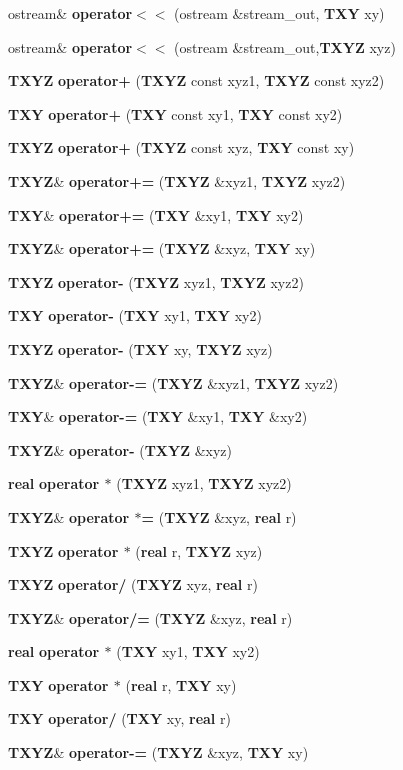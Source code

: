 \begin{CompactItemize}
\item 
ostream\& {\bf operator$<$$<$} (ostream \&stream\_\-out, {\bf TXY} xy)
\item 
ostream\& {\bf operator$<$$<$} (ostream \&stream\_\-out,{\bf TXYZ} xyz)
\item 
{\bf TXYZ} {\bf operator+} ({\bf TXYZ} const xyz1, {\bf TXYZ} const xyz2)
\item 
{\bf TXY} {\bf operator+} ({\bf TXY} const xy1, {\bf TXY} const xy2)
\item 
{\bf TXYZ} {\bf operator+} ({\bf TXYZ} const xyz, {\bf TXY} const xy)
\item 
{\bf TXYZ}\& {\bf operator+=} ({\bf TXYZ} \&xyz1, {\bf TXYZ} xyz2)
\item 
{\bf TXY}\& {\bf operator+=} ({\bf TXY} \&xy1, {\bf TXY} xy2)
\item 
{\bf TXYZ}\& {\bf operator+=} ({\bf TXYZ} \&xyz, {\bf TXY} xy)
\item 
{\bf TXYZ} {\bf operator-} ({\bf TXYZ} xyz1, {\bf TXYZ} xyz2)
\item 
{\bf TXY} {\bf operator-} ({\bf TXY} xy1, {\bf TXY} xy2)
\item 
{\bf TXYZ} {\bf operator-} ({\bf TXY} xy, {\bf TXYZ} xyz)
\item 
{\bf TXYZ}\& {\bf operator-=} ({\bf TXYZ} \&xyz1, {\bf TXYZ} xyz2)
\item 
{\bf TXY}\& {\bf operator-=} ({\bf TXY} \&xy1, {\bf TXY} \&xy2)
\item 
{\bf TXYZ}\& {\bf operator-} ({\bf TXYZ} \&xyz)
\item 
{\bf real} {\bf operator $\ast$} ({\bf TXYZ} xyz1, {\bf TXYZ} xyz2)
\item 
{\bf TXYZ}\& {\bf operator $\ast$=} ({\bf TXYZ} \&xyz, {\bf real} r)
\item 
{\bf TXYZ} {\bf operator $\ast$} ({\bf real} r, {\bf TXYZ} xyz)
\item 
{\bf TXYZ} {\bf operator/} ({\bf TXYZ} xyz, {\bf real} r)
\item 
{\bf TXYZ}\& {\bf operator/=} ({\bf TXYZ} \&xyz, {\bf real} r)
\item 
{\bf real} {\bf operator $\ast$} ({\bf TXY} xy1, {\bf TXY} xy2)
\item 
{\bf TXY} {\bf operator $\ast$} ({\bf real} r, {\bf TXY} xy)
\item 
{\bf TXY} {\bf operator/} ({\bf TXY} xy, {\bf real} r)
\item 
{\bf TXYZ}\& {\bf operator-=} ({\bf TXYZ} \&xyz, {\bf TXY} xy)
\end{CompactItemize}
